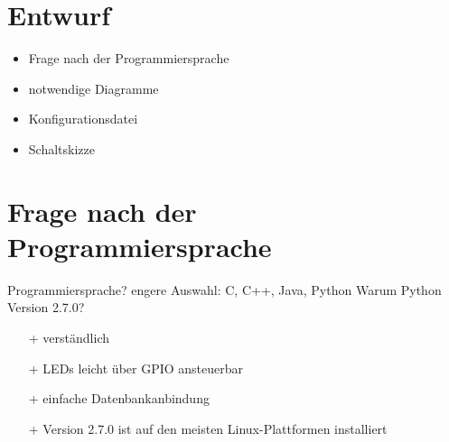 \documentclass[ignorenonframetext, 11pt, table]{beamer}
\begin{document}
\section*{Entwurf}
\begin{frame}
	\begin{itemize}
		\setlength\itemsep{0.2em}
		\item Frage nach der Programmiersprache
		\item notwendige Diagramme
		\item Konfigurationsdatei
		\item Schaltskizze
	\end{itemize}
\end{frame}

\section{Frage nach der Programmiersprache}
\begin{frame}[fragile]
	Programmiersprache? \newline\newline\newline \pause
	engere Auswahl: C, C++, Java, Python	\newline\newline \pause
	Warum Python Version 2.7.0?
	\begin{itemize}
		\setlength\itemsep{0.2em}
		\item[+] verständlich
		\item[+] LEDs leicht über GPIO ansteuerbar
		\item[+] einfache Datenbankanbindung
		\item[+] Version 2.7.0 ist auf den meisten Linux-Plattformen installiert
	\end{itemize} 	
	
\end{frame}
\end{document}
